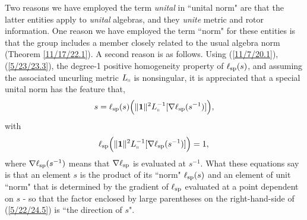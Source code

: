 \documentclass{amsart}
\numberwithin{equation}{section}
\theoremstyle{definition}
\numberwithin{theorem}{section}
\begin{document}
Two reasons we have employed the term {\it unital} in ``unital norm" are that the latter entities apply to {\it unital} algebras, and they {\it unite} metric and rotor information.  One reason we have employed the term ``norm" for these entities is that the group includes a member closely related to the usual algebra norm (Theorem \ref{11/17/22.1}).  A second reason is as follows.   Using (\ref{11/7/20.1}), (\ref{5/23/23.3}), the degree-1 positive homogeneity property of $\ell_{\rm sp}(s)$, and assuming the associated uncurling metric $L_{\shortparallel}$ is nonsingular, it is appreciated that a special unital norm has the feature that, 
\begin{equation}\label{5/22/24.5}  s = \ell_{\rm sp}(s)\Big(\|\mathbf{1}\|^2 L_{\shortparallel}^{-1}[\nabla\ell_{\rm sp}(s^{-1})]\Big),\end{equation} with
\begin{equation}\label{5/22/24.6}\ell_{\rm sp}\Big(\|\mathbf{1}\|^2 L_{\shortparallel}^{-1}[\nabla\ell_{\rm sp}(s^{-1})]\Big) = 1,\,\end{equation}
where $\nabla\ell_{\rm sp}(s^{-1})$ means that $\nabla\ell_{\rm sp}$ is evaluated at $s^{-1}$.  What these equations say is that an element $s$ is the product of its ``norm" $\ell_{\rm sp}(s)$ and an element of unit ``norm" that is determined by the gradient of $\ell_{\rm sp}$ evaluated at a point dependent on $s$ - so that the factor enclosed by large parentheses on the right-hand-side of (\ref{5/22/24.5}) is  ``the direction of $s$".  
\end{document}
